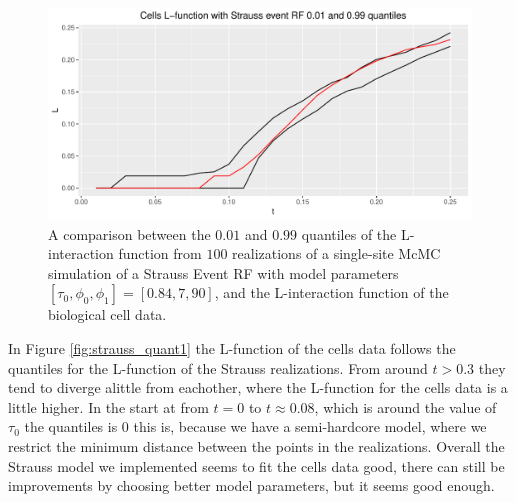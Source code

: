 \begin{figure}
    \centering
    \includegraphics[scale=0.65]{figures/strauss_quant2.pdf}
    \caption{A comparison between the $0.01$ and $0.99$ quantiles of the L-interaction function from $100$ realizations of a single-site McMC simulation of a Strauss Event RF with model parameters $[\tau_0,\phi_0,\phi_1] = [0.84,7,90]$, and the L-interaction function of the biological cell data.}
    \label{fig:strauss_quant2}
\end{figure}

In Figure \ref{fig:strauss_quant1} the L-function of the cells data follows the quantiles for the L-function of the Strauss realizations. From around $t>0.3$ they tend to diverge alittle from eachother, where the L-function for the cells data is a little higher. In the start at from $t=0$ to $t\approx 0.08$, which is around the value of $\tau_0$ the quantiles is $0$ this is, because we have a semi-hardcore model, where we restrict the minimum distance between the points in the realizations. Overall the Strauss model we implemented seems to fit the cells data good, there can still be improvements by choosing better model parameters, but it seems good enough. 